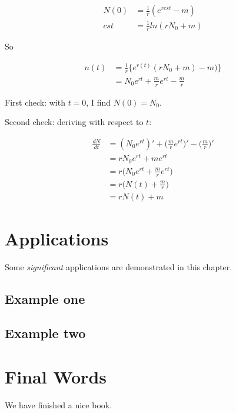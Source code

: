 \documentclass[
]{book}
\theoremstyle{definition}
\theoremstyle{definition}
\theoremstyle{definition}
\theoremstyle{definition}
\theoremstyle{remark}
\begin{document}
\[
\begin{align}
  N(0) &= \frac{1}{r}(e^{r cst} - m) \\
  cst  &= \frac{1}{r} ln(r N_{0} + m)
\end{align}
\]

So

\[
\begin{align}
   n(t) &= \frac{1}{r}\{e^{r(t)}(rN_0 + m) - m)\} \\
   &= N_0e^{rt} + \frac{m}{r}e^{rt} - \frac{m}{r}
\end{align}
\]

First check: with \(t = 0\), I find \(N(0) = N_0\).

Second check: deriving with respect to \(t\):

\[
\begin{align}
   \frac{dN}{dt} &= (N_0e^{rt})' + \Big(\frac{m}{r}e^{rt}\Big)' - \Big(\frac{m}{r}\Big)' \\
   &= rN_0e^{rt} + me^{rt} \\
   &= r\Big(N_0e^{rt} + \frac{m}{r}e^{rt}\Big) \\
   &= r\Big(N(t) + \frac{m}{r}\Big) \\
   &= rN(t) + m
\end{align}
\]

\hypertarget{applications}{%
\chapter{Applications}\label{applications}}

Some \emph{significant} applications are demonstrated in this chapter.

\hypertarget{example-one}{%
\section{Example one}\label{example-one}}

\hypertarget{example-two}{%
\section{Example two}\label{example-two}}

\hypertarget{final-words}{%
\chapter{Final Words}\label{final-words}}

We have finished a nice book.

  
\end{document}
